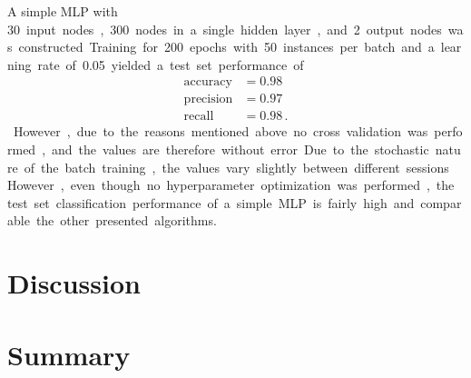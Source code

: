 \documentclass[12pt, a4paper]{scrartcl}
\begin{document}
A simple MLP with \SI{30} input nodes, \SI{300} nodes in a single hidden layer, and \SI{2} output nodes was constructed. Training for \SI{200} epochs with \SI{50} instances per batch and a learning rate of \SI{0.05} yielded a test set performance of 
\begin{align*}
	\text{accuracy} &= 0.98 \\
	\text{precision} &= 0.97  \\
	\text{recall} &= 0.98  \, .
\end{align*}
However, due to the reasons mentioned above no cross validation was performed, and the values are therefore without error. Due to the stochastic nature of the batch training, the values vary slightly between different sessions. However, even though no hyperparameter optimization was performed, the test set classification performance of a simple MLP is fairly high and comparable the other presented algorithms.

\section{Discussion}
\label{sec:discu}



\section{Summary}
\label{sec:sum}





\end{document}
